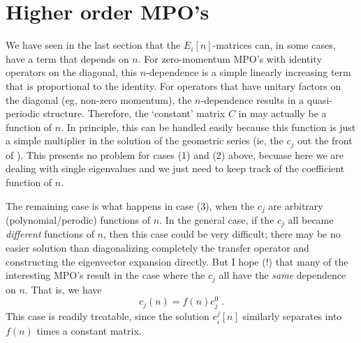 \documentclass{article}[10pt]
\begin{document}
\section{Higher order MPO's}

We have seen in the last section that the $E_i[n]$-matrices can, in some cases,
have a term that depends on $n$. For zero-momentum MPO's with identity operators
on the diagonal, this $n$-dependence is a simple linearly increasing term
that is proportional to the identity. For operators that have unitary factors
on the diagonal (eg, non-zero momentum), the $n$-dependence results in a quasi-periodic
structure. Therefore, 
the `constant' matrix $C$ in  may actually be
a function of $n$. In principle, this can be handled easily because this
function is just a simple multiplier in the solution of the geometric series
(ie, the $c_j$ out the front of ). This presents no problem
for cases (1) and (2) above, becuase here we are dealing with single eigenvalues
and we just need to keep track of the coefficient function of $n$. 

The remaining case is what happens in case (3), when the $c_j$ are arbitrary
(polynomial/perodic) functions of $n$. In the general case, if the $c_j$ all
became \emph{different} functions of $n$, then this case could be very difficult;
there may be no easier solution than diagonalizing completely the transfer operator
and constructing the eigenvector expansion  directly.
But I hope (!) that many of the interesting MPO's result in the case where
the $c_j$ all have the \emph{same} dependence on $n$. That is, we have
\begin{equation}
c_j(n) = f(n) c^0_j \; .
\end{equation}
This case is readily treatable, since the solution $e^j_i[n]$ similarly
separates into $f(n)$ times a constant matrix.
\end{document}
